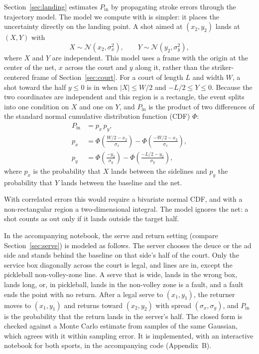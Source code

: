   Section~\ref{sec:landing} estimates $P_{\mathrm{in}}$ by propagating stroke
  errors through the trajectory model. The model we compute with is simpler:
  it places the uncertainty directly on the landing point. A shot aimed at
  $(x_2, y_2)$ lands at $(X, Y)$ with
  \begin{equation}
  X \sim \mathcal{N}(x_2, \sigma_x^2), \qquad
  Y \sim \mathcal{N}(y_2, \sigma_y^2),
  \end{equation}
  where $X$ and $Y$ are independent. This model uses a frame with the origin at
  the center of the net, $x$ across the court and $y$ along it, rather than the
  striker-centered frame of Section~\ref{sec:court}. For a court of length $L$
  and width $W$, a shot toward the half $y \le 0$ is in when $|X| \le W/2$ and
  $-L/2 \le Y \le 0$. Because the two coordinates are independent and this
  region is a rectangle, the event splits into one condition on $X$ and one on
  $Y$, and $P_{\mathrm{in}}$ is the product of two differences of the standard
  normal cumulative distribution function (CDF) $\Phi$:
  \begin{equation}
  \begin{aligned}
  P_{\mathrm{in}} &= p_x \, p_y , \\
  p_x &= \Phi\left(\frac{W/2 - x_2}{\sigma_x}\right)
  - \Phi\left(\frac{-W/2 - x_2}{\sigma_x}\right) , \\
  p_y &= \Phi\left(\frac{-y_2}{\sigma_y}\right)
  - \Phi\left(\frac{-L/2 - y_2}{\sigma_y}\right) ,
  \end{aligned}
  \end{equation}
  where $p_x$ is the probability that $X$ lands between the sidelines and $p_y$
  the probability that $Y$ lands between the baseline and the net.

  With correlated errors this would require a bivariate normal CDF, and with a
  non-rectangular region a two-dimensional integral. The model ignores the net:
  a shot counts as out only if it lands outside the target half.

  In the accompanying notebook, the serve and return setting (compare
  Section~\ref{sec:serve}) is modeled as follows. The server chooses the deuce
  or the ad side and stands behind the baseline on that side's half of the
  court. Only the service box diagonally across the court is legal, and lines
  are in, except the pickleball non-volley-zone line. A serve that is wide,
  lands in the wrong box, lands long, or, in pickleball, lands in the
  non-volley zone is a fault, and a fault ends the point with no return. After
  a legal serve to $(x_1, y_1)$, the returner moves to $(x_1, y_1)$ and returns
  toward $(x_2, y_2)$ with spread $(\sigma_x, \sigma_y)$, and $P_{\mathrm{in}}$
  is the probability that the return lands in the server's half. The closed
  form is checked against a Monte Carlo estimate from samples of the same
  Gaussian, which agrees with it within sampling error. It is implemented, with
  an interactive notebook for both sports, in the accompanying code
  (Appendix~B).

